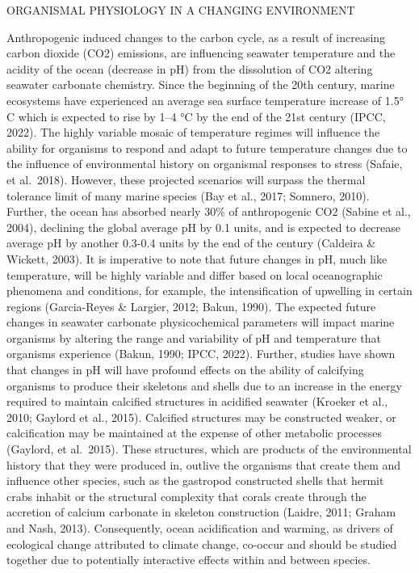 \documentclass[
  11pt,
]{article}
\begin{document}
\begin{centering}
\begin{centering}
ORGANISMAL PHYSIOLOGY IN A CHANGING ENVIRONMENT
\end{centering}

Anthropogenic induced changes to the carbon cycle, as a result of
increasing carbon dioxide (CO2) emissions, are influencing seawater
temperature and the acidity of the ocean (decrease in pH) from the
dissolution of CO2 altering seawater carbonate chemistry. Since the
beginning of the 20th century, marine ecosystems have experienced an
average sea surface temperature increase of 1.5° C which is expected to
rise by 1--4 °C by the end of the 21st century (IPCC, 2022). The highly
variable mosaic of temperature regimes will influence the ability for
organisms to respond and adapt to future temperature changes due to the
influence of environmental history on organismal responses to stress
(Safaie, et al.~2018). However, these projected scenarios will surpass
the thermal tolerance limit of many marine species (Bay et al., 2017;
Somnero, 2010). Further, the ocean has absorbed nearly 30\% of
anthropogenic CO2 (Sabine et al., 2004), declining the global average pH
by 0.1 units, and is expected to decrease average pH by another 0.3-0.4
units by the end of the century (Caldeira \& Wickett, 2003). It is
imperative to note that future changes in pH, much like temperature,
will be highly variable and differ based on local oceanographic
phenomena and conditions, for example, the intensification of upwelling
in certain regions (Garcia-Reyes \& Largier, 2012; Bakun, 1990). The
expected future changes in seawater carbonate physicochemical parameters
will impact marine organisms by altering the range and variability of pH
and temperature that organisms experience (Bakun, 1990; IPCC, 2022).
Further, studies have shown that changes in pH will have profound
effects on the ability of calcifying organisms to produce their
skeletons and shells due to an increase in the energy required to
maintain calcified structures in acidified seawater (Kroeker et al.,
2010; Gaylord et al., 2015). Calcified structures may be constructed
weaker, or calcification may be maintained at the expense of other
metabolic processes (Gaylord, et al.~2015). These structures, which are
products of the environmental history that they were produced in,
outlive the organisms that create them and influence other species, such
as the gastropod constructed shells that hermit crabs inhabit or the
structural complexity that corals create through the accretion of
calcium carbonate in skeleton construction (Laidre, 2011; Graham and
Nash, 2013). Consequently, ocean acidification and warming, as drivers
of ecological change attributed to climate change, co-occur and should
be studied together due to potentially interactive effects within and
between species.


\end{centering}
\end{document}
